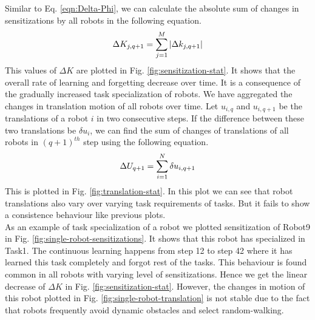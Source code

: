 \documentclass{llncs}
\begin{document}
%
Similar to Eq. \ref{eqn:Delta-Phi}, we can calculate the absolute sum of changes in sensitizations by all robots in the following equation.
% 
\begin{equation}
\small 
\Delta K_{j, q+1} = \sum_{j=1}^{M} \left | \Delta k_{j, q+1} \right |
\label{eqn:Delta-K}
\end{equation}
This values of $\Delta K$ are plotted in Fig. \ref{fig:sensitization-stat}. It shows that the overall rate of learning and forgetting decrease over time. It is a consequence of the gradually increased task specialization of robots.
We have aggregated the changes in translation motion of all robots over time. Let $u_{i,q}$ and $u_{i,q+1}$ be the translations of a robot $i$ in two consecutive steps. If the difference between these two translations be $\delta u_{i}$, we can find the sum of changes of translations of all robots in $(q+1)^{th}$ step using the following equation.
\begin{equation}
\small 
\Delta U_{q+1} = \sum_{i=1}^{N} \delta u_{i, q+1} 
\label{eqn:Delta-Tr}
\end{equation}
This is plotted in Fig. \ref{fig:translation-stat}. In this plot we can see that robot translations also vary over varying task requirements of tasks. But it fails to show a consistence behaviour like previous plots.\\
As an example of task specialization of a robot we plotted sensitization of Robot9 in Fig. \ref{fig:single-robot-sensitizations}. It shows that this robot has specialized in Task1. The continuous learning happens from step 12 to step 42 where it has learned this task completely and forgot rest of the tasks. This behaviour is found common in all robots with varying level of sensitizations. Hence we get the linear decrease of $\Delta K$ in Fig. \ref{fig:sensitization-stat}. However, the changes in motion of this robot plotted in Fig. \ref{fig:single-robot-translation} is not stable due to the fact that robots frequently avoid dynamic obstacles and select random-walking.
\end{document}
